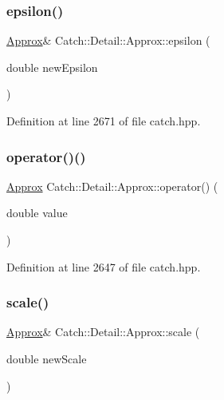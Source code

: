 \subsubsection{\texorpdfstring{epsilon()}{epsilon()}}
{\footnotesize\ttfamily \hyperlink{class_catch_1_1_detail_1_1_approx}{Approx}\& Catch\+::\+Detail\+::\+Approx\+::epsilon (\begin{DoxyParamCaption}\item[{double}]{new\+Epsilon }\end{DoxyParamCaption})\hspace{0.3cm}{\ttfamily [inline]}}



Definition at line 2671 of file catch.\+hpp.

\hypertarget{class_catch_1_1_detail_1_1_approx_a48c9cbc28a05dc9dc8c3973b9eae2268}{}\label{class_catch_1_1_detail_1_1_approx_a48c9cbc28a05dc9dc8c3973b9eae2268} 
\subsubsection{\texorpdfstring{operator()()}{operator()()}}
{\footnotesize\ttfamily \hyperlink{class_catch_1_1_detail_1_1_approx}{Approx} Catch\+::\+Detail\+::\+Approx\+::operator() (\begin{DoxyParamCaption}\item[{double}]{value }\end{DoxyParamCaption})\hspace{0.3cm}{\ttfamily [inline]}}



Definition at line 2647 of file catch.\+hpp.

\hypertarget{class_catch_1_1_detail_1_1_approx_acd80f0737bf38112beacd5ca95bef113}{}\label{class_catch_1_1_detail_1_1_approx_acd80f0737bf38112beacd5ca95bef113} 
\subsubsection{\texorpdfstring{scale()}{scale()}}
{\footnotesize\ttfamily \hyperlink{class_catch_1_1_detail_1_1_approx}{Approx}\& Catch\+::\+Detail\+::\+Approx\+::scale (\begin{DoxyParamCaption}\item[{double}]{new\+Scale }\end{DoxyParamCaption})\hspace{0.3cm}{\ttfamily [inline]}}



